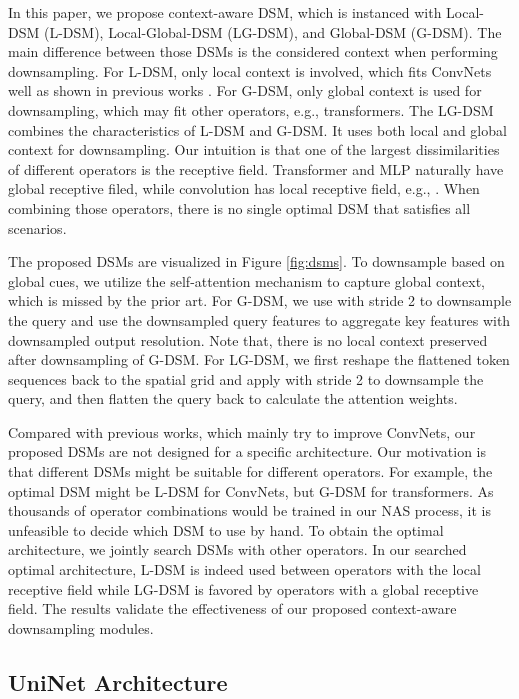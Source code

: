\documentclass[runningheads]{llncs}
\begin{document}
In this paper, we propose context-aware DSM, which is instanced with Local-DSM (L-DSM), Local-Global-DSM (LG-DSM), and Global-DSM (G-DSM). The main difference between those DSMs is the considered context when performing downsampling. For L-DSM, only local context is involved, which fits ConvNets well as shown in previous works \cite{pvt,swin}. For G-DSM, only global context is used for downsampling, which may fit other operators, e.g., transformers. The LG-DSM combines the characteristics of L-DSM and G-DSM. It uses both local and global context for downsampling. Our intuition is that one of the largest dissimilarities of different operators is the receptive field. Transformer and MLP naturally have global receptive filed, while convolution has local receptive field, e.g., . When combining those operators, there is no single optimal DSM that satisfies all scenarios.

The proposed DSMs are visualized in Figure \ref{fig:dsms}. To downsample based on global cues, we utilize the self-attention mechanism to capture global context, which is missed by the prior art. 
For G-DSM, we use  with stride 2 to downsample the query and use the downsampled query features to aggregate key features with downsampled output resolution.
Note that, there is no local context preserved after downsampling of G-DSM. For LG-DSM, we first reshape the flattened token sequences back to the spatial grid and apply  with stride 2 to downsample the query, and then flatten the query back to calculate the attention weights.

Compared with previous works, which mainly try to improve ConvNets, our proposed DSMs are not designed for a specific architecture. Our motivation is that different DSMs might be suitable for different operators. For example, the optimal DSM might be L-DSM for ConvNets, but G-DSM for transformers. As thousands of operator combinations would be trained in our NAS process, it is unfeasible to decide which DSM to use by hand. To obtain the optimal architecture, we jointly search DSMs with other operators. 
In our searched optimal architecture, L-DSM is indeed used between operators with the local receptive field while LG-DSM is favored by operators with a global receptive field. The results validate the effectiveness of our proposed context-aware downsampling modules.


\subsection{UniNet Architecture}
\end{document}
